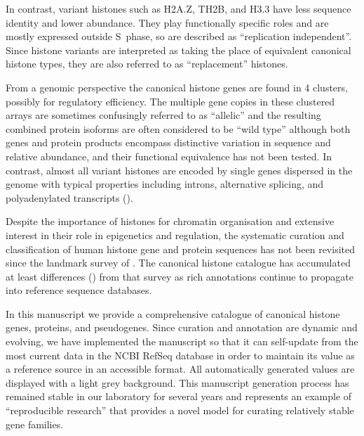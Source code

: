   In contrast, variant histones such as H2A.Z, TH2B, and H3.3 have
  less sequence identity and lower abundance.
  They play functionally specific roles and are mostly expressed outside S~phase,
  so are described as ``replication independent''.
  Since histone variants are interpreted as taking the place of equivalent canonical histone types,
  they are also referred to as ``replacement'' histones.

  From a genomic perspective the canonical histone genes are found in 4 clusters,
  possibly for regulatory efficiency.
  The multiple gene copies in these clustered arrays are sometimes confusingly referred to as ``allelic''
  and the resulting combined protein isoforms are often considered to be ``wild type''
  although both genes and protein products encompass distinctive variation in sequence and relative abundance,
  and their functional equivalence has not been tested.
  In contrast, almost all variant histones are encoded by single genes dispersed in the genome
  with typical properties including introns, alternative splicing,
  and polyadenylated transcripts ().

  Despite the importance of histones for chromatin organisation and extensive interest
  in their role in epigenetics and regulation, the systematic curation and classification of human histone
  gene and protein sequences has not been revisited
  since the landmark survey of \citet{Marzluff02}.
  The canonical histone catalogue has accumulated at least
   differences ()
  from that survey as rich annotations continue to propagate into reference sequence databases.

  In this manuscript we provide a comprehensive catalogue
  of canonical histone genes, proteins, and pseudogenes.
  Since curation and annotation are dynamic and evolving,
  we have implemented the manuscript so that it can
  self-update from the most current data in the NCBI RefSeq database
  in order to maintain its value as a reference source in an accessible format.
  All automatically generated values are displayed with a light grey background.
  This manuscript generation process has remained stable in our laboratory for several years
  and represents an example of ``reproducible research'' \citep{Claerbout2000}
  that provides a novel model for curating relatively stable gene families.


